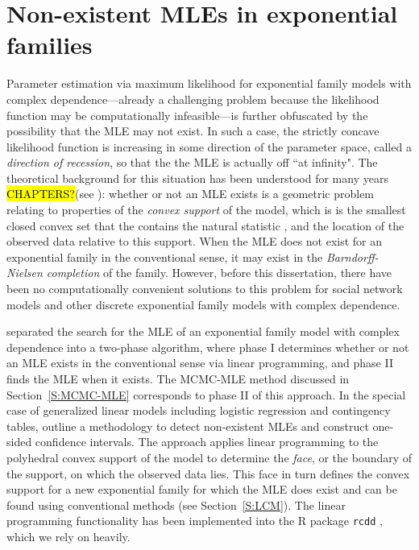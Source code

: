 \section{Non-existent MLEs in exponential families} \label{S:Non-existent MLE}
Parameter estimation via maximum likelihood for exponential family models with 
complex dependence---already a 
challenging problem because the likelihood function may be computationally 
infeasible---is further obfuscated by the possibility that the MLE
may not exist.  
In such a case, the strictly concave likelihood function is
increasing in some direction of the parameter space, called a 
\emph{direction of recession}, so that the the MLE is actually off ``at infinity".
The theoretical background 
for this situation has been understood for many years 
\hl{CHAPTERS?}(see \citep{Barndorff,Brown:1986}): whether or not an MLE exists is a
geometric problem relating to properties of the \emph{convex support} of the model,
which is  is the smallest closed convex set 
that the contains the natural statistic \citep{Geyer:gdor},
and the location of the observed data relative to this support.
When the MLE does not exist for
an exponential family in the conventional sense, 
it may exist in the \emph{Barndorff-Nielsen completion} of the family.
However, before this dissertation, there have been no 
computationally convenient solutions to this problem for social network models
and other discrete exponential family models with complex dependence.

\citet{Geyer:1992} separated the search for the MLE of an exponential family model
with complex dependence into a two-phase algorithm, 
where phase I determines whether or not an MLE exists in the conventional 
sense via linear programming, and phase II finds the MLE when it exists.
The MCMC-MLE method discussed in Section~\ref{S:MCMC-MLE} corresponds to phase II of
this approach.
In the special case of generalized linear models including logistic regression and contingency 
tables, \citet{Geyer:gdor} outline a methodology to detect non-existent MLEs and construct 
one-sided confidence intervals.
The approach applies linear programming to the polyhedral convex support of 
the model to determine the \emph{face}, or the boundary of the support, 
on which the observed data lies.  
This face in turn defines the convex support for a new exponential family for which the MLE 
does exist and can be found using conventional methods (see Section~\ref{S:LCM}).
The linear programming 
functionality has been implemented into the R package \texttt{rcdd} \citep*{rcdd:R},
which we rely on heavily.


